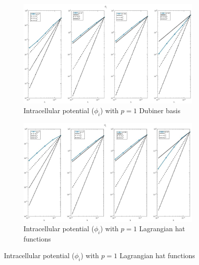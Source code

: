 \documentclass[a4paper,11pt]{article}
\begin{document}
\begin{figure}[H]
\caption{Comparison of the intracellular potential  ($\phi_i$)}
\label{phii_1}
\begin{subfigure}{\textwidth}
\begin{center}
\includegraphics[width = \textwidth]{./D1_Phii_1.jpg}
\caption{Intracellular potential ($\phi_i$) with $p=1$ Dubiner basis}
\end{center}
\end{subfigure}
\begin{subfigure}{\textwidth}
\begin{center}
\includegraphics[width =\textwidth]{./P1_Phii_1.jpg}
\caption{Intracellular potential ($\phi_i$) with $p=1$ Lagrangian hat functions}
\end{center}
\end{subfigure}
\end{figure}
\newpage
\end{document}
